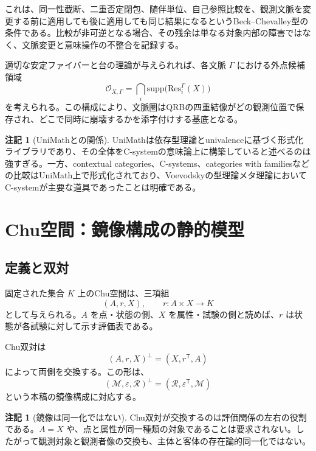 \documentclass[a4paper,11pt]{ltjsarticle}
\theoremstyle{definition}
\newtheorem{remark}[definition]{注記}
\theoremstyle{plain}
\newcommand{\Obj}{\mathcal M}
\newcommand{\Obs}{\mathcal R}
\newcommand{\Res}{\mathrm{Res}}
\newcommand{\supp}{\mathrm{supp}}
\begin{document}
これは、同一性截断、二重否定閉包、随伴単位、自己参照比較を、観測文脈を変更する前に適用しても後に適用しても同じ結果になるというBeck--Chevalley型の条件である。比較が非可逆となる場合、その残余は単なる対象内部の障害ではなく、文脈変更と意味操作の不整合を記録する。

適切な安定ファイバーと台の理論が与えられれば、各文脈 $\Gamma$ における外点候補領域
\begin{equation}
 \mathcal O_{X,\Gamma}
 =
 \bigcap_i
 \supp\bigl(\Res_i^{\Gamma}(X)\bigr)
\end{equation}
を考えられる。この構成により、文脈圏はQRBの四重結像がどの観測位置で保存され、どこで同時に崩壊するかを添字付けする基底となる。

\begin{remark}[UniMathとの関係]
UniMathは依存型理論とunivalenceに基づく形式化ライブラリであり、その全体をC-systemの意味論上に構築していると述べるのは強すぎる。一方、contextual categories、C-systems、categories with familiesなどの比較はUniMath上で形式化されており、Voevodskyの型理論メタ理論においてC-systemが主要な道具であったことは明確である\cite{AhrensLumsdaineVoevodsky2018}。
\end{remark}

\section{Chu空間：鏡像構成の静的模型}

\subsection{定義と双対}

固定された集合 $K$ 上のChu空間は、三項組
\begin{equation}
 (A,r,X),
 \qquad
 r:A\times X\longrightarrow K
\end{equation}
として与えられる\cite{Pratt1995}。$A$ を点・状態の側、$X$ を属性・試験の側と読めば、$r$ は状態が各試験に対して示す評価表である。

Chu双対は
\begin{equation}
 (A,r,X)^{\perp}=(X,r^{\mathsf T},A)
\end{equation}
によって両側を交換する。この形は、
\begin{equation}
 (\Obj,\varepsilon,\Obs)^{\perp}
 =
 (\Obs,\varepsilon^{\mathsf T},\Obj)
\end{equation}
という本稿の鏡像構成に対応する。

\begin{remark}[鏡像は同一化ではない]
Chu双対が交換するのは評価関係の左右の役割である。$A=X$ や、点と属性が同一種類の対象であることは要求されない。したがって観測対象と観測者像の交換も、主体と客体の存在論的同一化ではない。
\end{remark}
\end{document}
